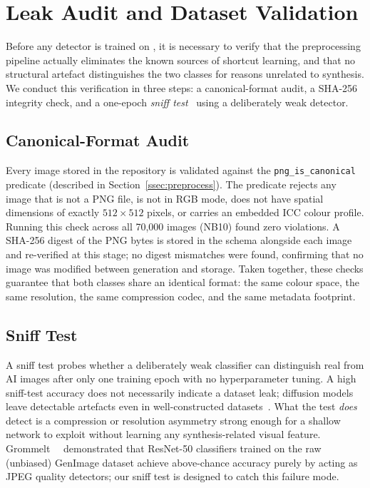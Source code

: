 
\section{Leak Audit and Dataset Validation}
\label{sec:audit}

Before any detector is trained on \textbf{\datasetname}, it is
necessary to verify that the preprocessing pipeline actually eliminates
the known sources of shortcut learning, and that no structural
artefact distinguishes the two classes for reasons unrelated to
synthesis.
We conduct this verification in three steps: a canonical-format
audit, a SHA-256 integrity check, and a one-epoch
\emph{sniff test}~\cite{grommelt2024jpeg} using a deliberately weak
detector.

\subsection{Canonical-Format Audit}
\label{ssec:audit_format}

Every image stored in the repository is validated against the
\texttt{png\_is\_canonical} predicate (described in
Section~\ref{ssec:preprocess}).
The predicate rejects any image that is not a PNG file, is not in RGB
mode, does not have spatial dimensions of exactly $512 \times 512$
pixels, or carries an embedded ICC colour profile.
Running this check across all 70,000 images (NB10) found zero
violations.
A SHA-256 digest of the PNG bytes is stored in the schema alongside
each image and re-verified at this stage; no digest mismatches were
found, confirming that no image was modified between generation and
storage.
Taken together, these checks guarantee that both classes share an
identical format: the same colour space, the same resolution, the same
compression codec, and the same metadata footprint.

\subsection{Sniff Test}
\label{ssec:sniff}

A sniff test probes whether a deliberately weak classifier can
distinguish real from AI images after only one training epoch with no
hyperparameter tuning.
A high sniff-test accuracy does not necessarily indicate a dataset
leak; diffusion models leave detectable artefacts even in
well-constructed datasets~\cite{corvi2023detection}.
What the test \emph{does} detect is a compression or resolution
asymmetry strong enough for a shallow network to exploit without
learning any synthesis-related visual feature.
Grommelt~\etal~\cite{grommelt2024jpeg} demonstrated that
ResNet-50 classifiers trained on the raw (unbiased) GenImage dataset
achieve above-chance accuracy purely by acting as JPEG quality
detectors; our sniff test is designed to catch this failure mode.

